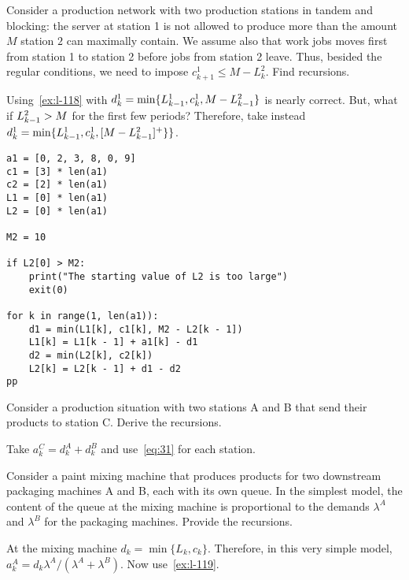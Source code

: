 \begin{exercise}
Consider  a production network with two production stations in tandem and blocking: the server at station 1 is not allowed to produce more than the amount $M$ station $2$ can maximally contain.
We assume also that work jobs moves first from station 1 to station 2 before jobs from station 2 leave.
Thus, besided the regular conditions, we need to impose $c^1_{k+1} \leq M-L^2_k$.
Find recursions.

\begin{solution} Using~\cref{ex:l-118} with $d^1_k = \min\{L^1_{k-1}, c_k^1, M-L^2_{k-1}\}$ is nearly correct.
But, what if  $L^2_{k-1}>M$ for the first few periods? Therefore,  take instead
$d^1_k = \min\{L_{k-1}^1, c_k^1, [M-L^2_{k-1}]^+\}\}$.


\begin{verbatim}
a1 = [0, 2, 3, 8, 0, 9]
c1 = [3] * len(a1)
c2 = [2] * len(a1)
L1 = [0] * len(a1)
L2 = [0] * len(a1)

M2 = 10

if L2[0] > M2:
    print("The starting value of L2 is too large")
    exit(0)

for k in range(1, len(a1)):
    d1 = min(L1[k], c1[k], M2 - L2[k - 1])
    L1[k] = L1[k - 1] + a1[k] - d1
    d2 = min(L2[k], c2[k])
    L2[k] = L2[k - 1] + d1 - d2
pp\end{verbatim}

\end{solution}
\end{exercise}

\begin{exercise}\label{ex:l-120}
 Consider  a production situation with two stations A and B that send their products to station C.
Derive the  recursions.
\begin{solution}
Take  $a_k^C = d_{k}^A+d_{k}^B$ and use~\cref{eq:31} for each station.
\end{solution}
\end{exercise}



\begin{exercise}
 Consider a paint mixing machine that produces products for two downstream packaging machines A and B, each with its own queue.
In the simplest model, the content of the queue at the mixing machine is proportional to the demands $\lambda^A$ and $\lambda^B$ for the packaging machines.
 Provide the recursions.
\begin{solution}
At  the mixing machine $d_k=\min\{L_k, c_k\}$. Therefore, in this very simple model, $a_k^A = d_k \lambda^A/(\lambda^A+\lambda^B)$.  Now use~\cref{ex:l-119}.
\end{solution}
\end{exercise}







